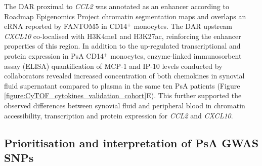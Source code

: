 The DAR proximal to \textit{CCL2} was annotated as an enhancer according to Roadmap Epigenomics Project chromatin segmentation maps and overlaps an eRNA reported by FANTOM5 in CD14$^+$ monocytes. The DAR upstream \textit{CXCL10} co-localised with H3K4me1 and H3K27ac, reinforcing the enhancer properties of this region. In addition to the up-regulated transcriptional and protein expression in PsA CD14$^+$ monocytes, enzyme-linked immunosorbent assay (ELISA) quantification of MCP-1 and IP-10 levels conducted by collaborators revealed increased concentration of both chemokines in synovial fluid supernatant compared to plasma in the same ten PsA patients (Figure \ref{figure:CyTOF_cytokines_validation_cohort}E). This further supported the observed differences between synovial fluid and peripheral blood in chromatin accessibility, transcription and protein expression for \textit{CCL2} and \textit{CXCL10}.





\subsection{Prioritisation and interpretation of PsA GWAS SNPs}


